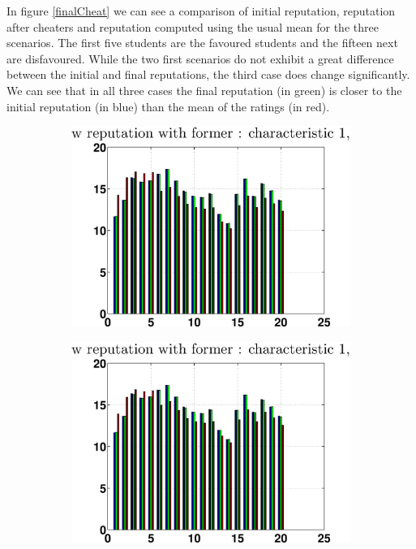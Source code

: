 \documentclass[12pt,a4paper]{article}
\begin{document}
In figure \ref{finalCheat} we can see a comparison of initial reputation, reputation after cheaters and reputation computed using the usual mean for the three scenarios. The first five students are the favoured students and the fifteen next are disfavoured. While the two first scenarios do not exhibit a great difference between the initial and final reputations, the third case does change significantly. We can see that in all three cases the final reputation (in green) is closer to the initial reputation (in blue) than the mean of the ratings (in red).
\begin{figure}[!ht]
\centering
\begin{subfigure}[b]{0.32\textwidth}
\includegraphics[width = \textwidth]{cheaters/chcompareRepStupidc1.eps}
\end{subfigure}
\begin{subfigure}[b]{0.32\textwidth}
\includegraphics[width = \textwidth]{cheaters/chcompareRepSmartc1.eps}

\end{subfigure}
\end{figure}
\end{document}
